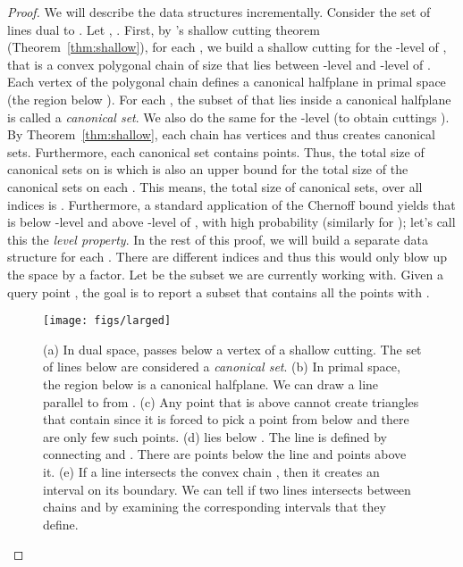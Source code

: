 \rlemfindlarge*
\begin{proof}
    We will describe the data structures incrementally.
    Consider the set  of  lines dual to .
    Let , . 
	First, by \Mat's shallow cutting theorem (Theorem~\ref{thm:shallow}), for each , we build a shallow
    cutting  for the -level of , that is a convex
    polygonal chain of size  that lies between -level and -level of
    . 
    Each vertex  of the polygonal chain  defines a canonical halfplane in primal space 
    (the region below ).
    For each , the subset of  that lies inside a canonical halfplane is called a \emph{canonical set}.
    We also do the same for the -level (to obtain cuttings ).
	By Theorem~\ref{thm:shallow}, each chain  has  vertices and thus creates  canonical sets.
	Furthermore, each canonical set contains  points.
    Thus, the total size of canonical sets on  is  which is also an upper bound for the total
	size of the canonical sets on each . 
	This means, the total size of canonical sets,
    over all indices  is .
    Furthermore, a standard application of the Chernoff bound yields that  is below
	-level and above -level of , with high probability (similarly for ); let's
	call this the \emph{level property}.
    In the rest of this proof, we will build a separate data structure for each .
    There are  different indices  and thus this would only blow up the space by a  factor.
    Let  be the subset we are currently working with. 
    Given a query point , the goal is to report a subset  that contains all
    the points  with .



    \begin{figure}[h]
        \centering
        \texttt{[image: figs/larged]}
        \caption{(a) In dual space,  passes below a vertex  of a shallow cutting. 
		The set of lines below  are considered a \emph{canonical set}.
		(b) In primal space, the region below  is a canonical halfplane. We
		can draw a line  parallel to  from .
		(c) Any point that is above  cannot create  triangles that contain  since it is forced
		to pick a point from below  and there are only few such points.
		(d)  lies below . The line  is defined by connecting  and . 
	There are  points below the line  and  points above it.
		(e) If a line intersects the convex chain , then it creates an interval on its boundary.
		We can tell if two lines intersects between chains  and  by examining the
	corresponding intervals that they define. }
        \label{fig:larged}
    \end{figure}


\end{proof}
